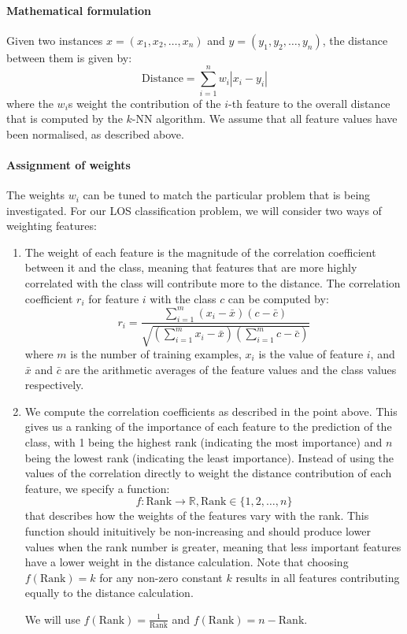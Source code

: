 \paragraph{Mathematical formulation}
Given two instances $x = (x_1,x_2,\ldots,x_n)$ and $y = (y_1,y_2,\ldots,y_n)$,
the distance between them is given by:
\begin{equation*}
\mathrm{Distance} = \sum_{i=1}^n w_i |x_i-y_i|
\end{equation*}
where the $w_i$s weight the contribution of the $i$-th feature to the overall
distance that is computed by the $k$-NN algorithm. We assume that all feature
values have been normalised, as described above.

\paragraph{Assignment of weights}
The weights $w_i$ can be tuned to match the particular problem that is being
investigated. For our LOS classification problem, we will consider two ways
of weighting features:
\begin{enumerate}
\item The weight of each feature is the magnitude of the correlation
coefficient
between it and the class, meaning that features that are more highly correlated
with the class will contribute more to the distance. The correlation
coefficient $r_i$ for feature $i$ with the class $c$ can be computed by:
\begin{equation*}
r_i = \dfrac{\sum_{i=1}^m (x_i-\bar{x})(c-\bar{c})}{\sqrt{(\sum_{i=1}^m x_i-\bar{x})(\sum_{i=1}^m c-\bar{c})}}
\end{equation*}
where $m$ is the number of training examples, $x_i$ is the value of feature
$i$, and $\bar{x}$ and $\bar{c}$ are the arithmetic averages of the feature
values and the class values respectively. 
\item We compute the correlation coefficients as described in the point above.
This gives us a ranking of the importance of each feature to the prediction of
the class, with 1 being the highest rank (indicating the most importance) and
$n$ being the lowest rank (indicating the least importance).
Instead of using the values of the correlation directly to weight
the distance contribution of each feature, we specify a function:
\begin{equation*}
f : \mathrm{Rank} \rightarrow \mathbb{R}, \mathrm{Rank} \in \{1,2,\ldots,n\}
\end{equation*}
that describes
how the weights of the features vary with the rank. This function should
inituitively be non-increasing and should produce lower values when the rank
number is greater, meaning that less important features have a lower weight
in the distance calculation.
Note that choosing $f(\mathrm{Rank}) = k$ for any non-zero constant $k$
results in all features contributing equally to the distance calculation.

\noindent We will use $f(\mathrm{Rank}) = \frac{1}{\mathrm{Rank}}$ and
$f(\mathrm{Rank}) = n-\mathrm{Rank}$.
\end{enumerate}

